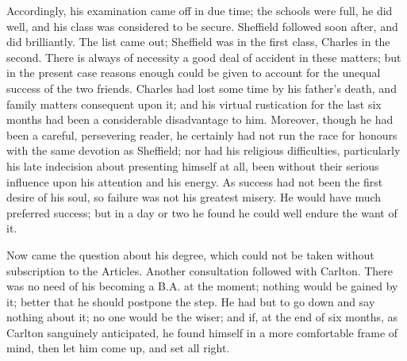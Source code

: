 Accordingly, his examination came off in due time; the schools were
full, he did well, and his class was considered to be secure.
Sheffield followed soon after, and did brilliantly. The list came out;
Sheffield was in the first class, Charles in the second. There is
always of necessity a good deal of accident in these matters; but in
the present case reasons enough could be given to account for the
unequal success of the two friends. Charles had lost some time by his
father's death, and family matters consequent upon it; and his
virtual rustication for the last six months had been a considerable
disadvantage to him. Moreover, though he had been a careful,
persevering reader, he certainly had not run the race for honours with
the same devotion as Sheffield; nor had his religious difficulties,
particularly his late indecision about presenting himself at all, been
without their serious influence upon his attention and his energy. As
success had not been the first desire of his soul, so failure was not
his greatest misery. He would have much preferred success; but in a
day or two he found he could well endure the want of it.

Now came the question about his degree, which could not be taken
without subscription to the Articles. Another consultation followed
with Carlton. There was no need of his becoming a B.A. at the moment;
nothing would be gained by it; better that he should postpone the
step. He had but to go down and say nothing about it; no one would be
the wiser; and if, at the end of six months, as Carlton sanguinely
anticipated, he found himself in a more comfortable frame of mind,
then let him come up, and set all right.

